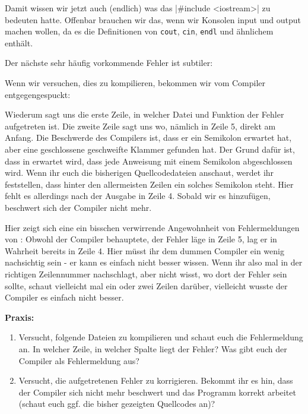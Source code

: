 Damit wissen wir jetzt auch (endlich) was das |#include <iostream>|
zu bedeuten hatte. Offenbar brauchen wir das, wenn wir Konsolen input und
output machen wollen, da es die Definitionen von \texttt{cout}, \texttt{cin},
\texttt{endl} und ähnlichem enthält.

Der nächste sehr häufig vorkommende Fehler ist subtiler:


Wenn wir versuchen, dies zu kompilieren, bekommen wir vom Compiler
entgegengespuckt:

\begin{textcode*}{label=g++ -o fehler2 noSemicolon_broken.cpp}
    noSemicolon_broken.cpp: In function 'int main()':
    noSemicolon_broken.cpp:5:1: error: expected ';' before '}' token
\end{textcode*}

Wiederum sagt uns die erste Zeile, in welcher Datei und Funktion der Fehler
aufgetreten ist. Die zweite Zeile sagt uns wo, nämlich in Zeile 5, direkt am
Anfang. Die Beschwerde des Compilers ist, dass er ein Semikolon erwartet hat,
aber eine geschlossene geschweifte Klammer gefunden hat. Der Grund dafür ist,
dass in \Cpp erwartet wird, dass jede Anweisung mit einem Semikolon abgeschlossen
wird.  Wenn ihr euch die bisherigen Quellcodedateien anschaut, werdet ihr
feststellen, dass hinter den allermeisten Zeilen ein solches Semikolon steht.
Hier fehlt es allerdings nach der Ausgabe in Zeile 4. Sobald wir es hinzufügen,
beschwert sich der Compiler nicht mehr.

Hier zeigt sich eine ein bisschen verwirrende Angewohnheit von Fehlermeldungen
von \Cpp: Obwohl der Compiler behauptete, der Fehler läge in Zeile 5, lag er in
Wahrheit bereits in Zeile 4. Hier müsst ihr dem dummen Compiler ein wenig
nachsichtig sein - er kann es einfach nicht besser wissen. Wenn ihr also mal in
der richtigen Zeilennummer nachschlagt, aber nicht wisst, wo dort der Fehler
sein sollte, schaut vielleicht mal ein oder zwei Zeilen darüber, vielleicht
wusste der Compiler es einfach nicht besser.

\textbf{Praxis:}
\begin{enumerate}
    \item Versucht, folgende Dateien zu kompilieren und schaut euch die
        Fehlermeldung an. In welcher Zeile, in welcher Spalte liegt der Fehler?
        Was gibt euch der Compiler als Fehlermeldung aus?
    \item Versucht, die aufgetretenen Fehler zu korrigieren. Bekommt ihr es
        hin, dass der Compiler sich nicht mehr beschwert und das Programm
        korrekt arbeitet (schaut euch ggf. die bisher gezeigten Quellcodes an)?
\end{enumerate}

